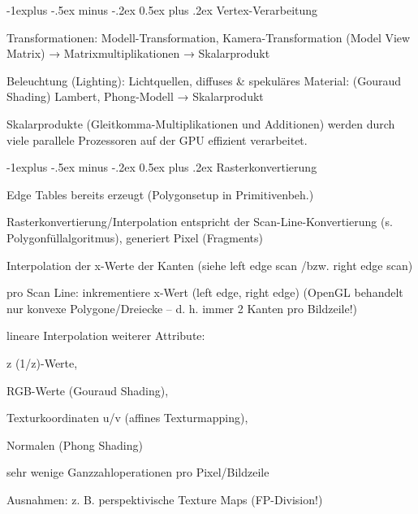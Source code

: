 \documentclass[landscape]{article}
\makeatletter
\renewcommand{\subsection}{\@startsection{subsection}{2}{0mm}%
                                {-1explus -.5ex minus -.2ex}%
                                {0.5ex plus .2ex}%
                                {\normalfont\normalsize\bfseries}}
\makeatother
\begin{document}
\begin{multicols}{3}
  
  \subsection{Vertex-Verarbeitung}
  \begin{itemize*}
    \item Transformationen: Modell-Transformation, Kamera-Transformation (Model View Matrix) → Matrixmultiplikationen → Skalarprodukt
    \item Beleuchtung (Lighting): Lichtquellen, diffuses \& spekuläres Material: (Gouraud Shading) Lambert, Phong-Modell → Skalarprodukt
    \item Skalarprodukte (Gleitkomma-Multiplikationen und Additionen) werden durch viele parallele Prozessoren auf der GPU effizient verarbeitet.
  \end{itemize*}
  
  
  \subsection{Rasterkonvertierung}
  \begin{itemize*}
    \item Edge Tables bereits erzeugt (Polygonsetup in Primitivenbeh.)
    \item Rasterkonvertierung/Interpolation entspricht der Scan-Line-Konvertierung (s. Polygonfüllalgoritmus), generiert Pixel (Fragments)
    \item Interpolation der x-Werte der Kanten (siehe left edge scan /bzw. right edge scan)
    \item pro Scan Line: inkrementiere x-Wert (left edge, right edge) (OpenGL behandelt nur konvexe Polygone/Dreiecke – d. h. immer 2 Kanten pro Bildzeile!)
    \item lineare Interpolation weiterer Attribute:
          \begin{itemize*}
            \item z (1/z)-Werte,
            \item RGB-Werte (Gouraud Shading),
            \item Texturkoordinaten u/v (affines Texturmapping),
            \item Normalen (Phong Shading)
          \end{itemize*}
    \item sehr wenige Ganzzahloperationen pro Pixel/Bildzeile
    \item Ausnahmen: z. B. perspektivische Texture Maps (FP-Division!)
  \end{itemize*}
  

\end{multicols}
\end{document}
